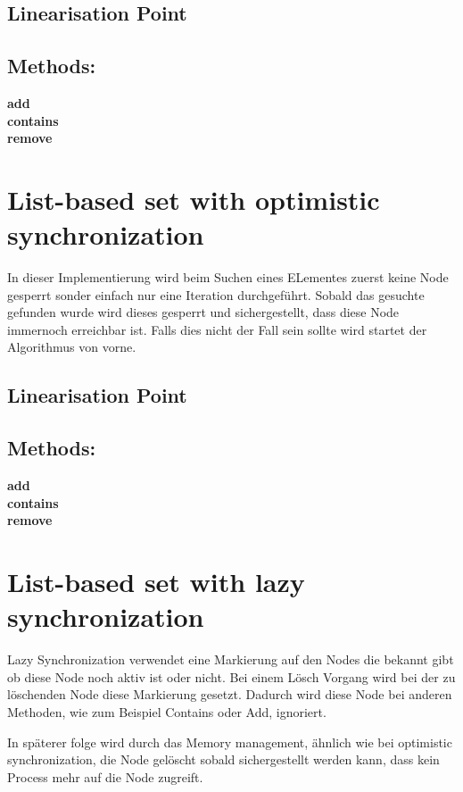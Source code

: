 \documentclass[10pt,a4paper,titlepage,oneside]{article}
\begin{document}
\subsection{Linearisation Point}

\subsection{Methods:}
\textbf{add}\\
\textbf{contains}\\
\textbf{remove}

\section{List-based set with optimistic synchronization}

In dieser Implementierung wird beim Suchen eines ELementes zuerst keine Node gesperrt sonder einfach nur eine Iteration durchgeführt. Sobald das gesuchte gefunden wurde wird dieses gesperrt und sichergestellt, dass diese Node immernoch erreichbar ist. Falls dies nicht der Fall sein sollte wird startet der Algorithmus von vorne.

\subsection{Linearisation Point}

\subsection{Methods:}
\textbf{add}\\
\textbf{contains}\\
\textbf{remove}

\section{List-based set with lazy synchronization}

Lazy Synchronization verwendet eine Markierung auf den Nodes die bekannt gibt ob diese Node noch aktiv ist oder nicht. Bei einem Lösch Vorgang wird bei der zu löschenden Node diese Markierung gesetzt. Dadurch wird diese Node bei anderen Methoden, wie zum Beispiel Contains oder Add, ignoriert. 

In späterer folge wird durch das Memory management, ähnlich wie bei optimistic synchronization, die Node gelöscht sobald sichergestellt werden kann, dass kein Process mehr auf die Node zugreift.
\end{document}
